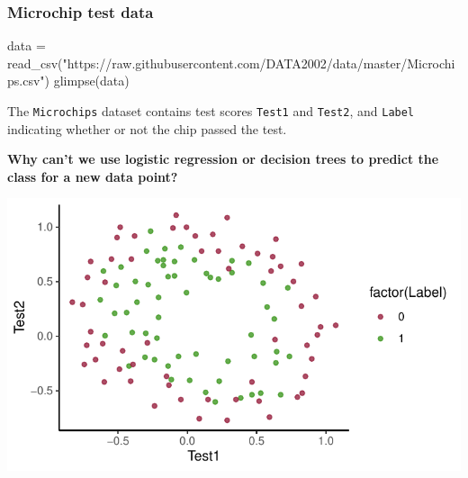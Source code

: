 \documentclass[a4paper]{article}
\begin{document}
\subsubsection{Microchip test data}
\begin{Schunk}
\begin{Sinput}
data = read_csv("https://raw.githubusercontent.com/DATA2002/data/master/Microchips.csv")
glimpse(data)
\end{Sinput}
\end{Schunk}
The \lstinline|Microchips| dataset contains test scores \lstinline|Test1| and \lstinline|Test2|, and \lstinline|Label| indicating whether or not the chip passed the test.
\begin{greenbox}
	\textbf{Why can't we use logistic regression or decision trees to predict the class for a new data point?}
\end{greenbox}
\begin{Schunk}


{\centering \includegraphics[width=\maxwidth]{figure/listings-unnamed-chunk-451-1} 

}

\end{Schunk}
\end{document}
